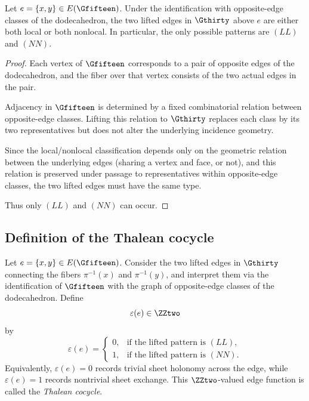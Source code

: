 \begin{proposition}
Let $e=\{x,y\}\in E(\Gfifteen)$. Under the identification with opposite-edge
classes of the dodecahedron, the two lifted edges in $\Gthirty$ above $e$
are either both local or both nonlocal. In particular, the only possible
patterns are $(LL)$ and $(NN)$.
\end{proposition}

\begin{proof}
Each vertex of $\Gfifteen$ corresponds to a pair of opposite edges of the
dodecahedron, and the fiber over that vertex consists of the two actual
edges in the pair.

Adjacency in $\Gfifteen$ is determined by a fixed combinatorial relation
between opposite-edge classes. Lifting this relation to $\Gthirty$ replaces
each class by its two representatives but does not alter the underlying
incidence geometry.

Since the local/nonlocal classification depends only on the geometric
relation between the underlying edges (sharing a vertex and face, or not),
and this relation is preserved under passage to representatives within
opposite-edge classes, the two lifted edges must have the same type.

Thus only $(LL)$ and $(NN)$ can occur.
\end{proof}

\subsection{Definition of the Thalean cocycle}

\begin{definition}
Let $e=\{x,y\}\in E(\Gfifteen)$. Consider the two lifted edges in
$\Gthirty$ connecting the fibers $\pi^{-1}(x)$ and $\pi^{-1}(y)$, and
interpret them via the identification of $\Gfifteen$ with the graph of
opposite-edge classes of the dodecahedron. Define
\[
\varepsilon(e)\in \ZZtwo
\]
by
\[
\varepsilon(e)=
\begin{cases}
0,&\text{if the lifted pattern is }(LL),\\
1,&\text{if the lifted pattern is }(NN).
\end{cases}
\]
Equivalently, $\varepsilon(e)=0$ records trivial sheet holonomy across
the edge, while $\varepsilon(e)=1$ records nontrivial sheet exchange.
This $\ZZtwo$-valued edge function is called the \emph{Thalean cocycle}.
\end{definition}

